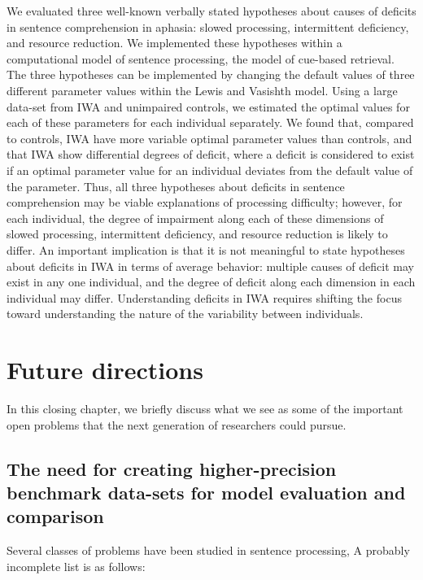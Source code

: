 \documentclass{cambridge7A}\usepackage[]{graphicx}\usepackage[]{color}
\begin{document}
We evaluated three well-known verbally stated hypotheses about causes of deficits in  sentence comprehension in aphasia: slowed processing, intermittent deficiency, and resource reduction. We implemented these hypotheses within a computational model of sentence processing, the \cite{LewisVasishth2005} model of cue-based retrieval. The three hypotheses can be implemented by changing the default values of three different parameter values within the Lewis and Vasishth model. Using a large data-set from IWA and unimpaired controls, 
we estimated the optimal values for each of these parameters for each individual separately. We found that, compared to controls, IWA have more variable optimal parameter values than controls, and that IWA show differential degrees of deficit, where a deficit is considered to exist if an optimal parameter value for an individual  deviates from the default value of the parameter. Thus, all three hypotheses about deficits in sentence comprehension may be viable explanations of processing difficulty; however, for each individual, the degree of impairment along each of these dimensions of slowed processing, intermittent deficiency, and resource reduction is likely to differ. An important implication is that it is not meaningful to state hypotheses about deficits in IWA  in terms of average behavior: multiple causes of deficit may exist in any one individual, and the degree of deficit along each dimension in each individual may differ. Understanding deficits in IWA requires shifting the focus toward understanding the nature of the variability between individuals.




\chapter{Future directions} \label{c09}


In this closing chapter, we briefly discuss what we see as some of the important open problems that the next generation of researchers could pursue.

\section{The need for creating higher-precision benchmark data-sets for model evaluation and comparison}

Several classes of problems have been studied in sentence processing, A probably incomplete list is as follows:
\end{document}
